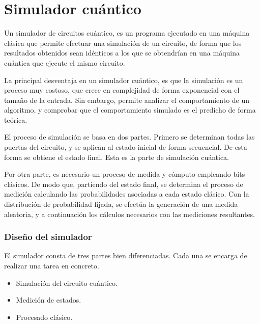 

\setcounter{part}{2}
\usetikzlibrary{shapes,arrows,chains}
\usetikzlibrary{decorations.markings}
\usepackage{booktabs}
\newcommand{\floor}[1]{\lfloor #1 \rfloor}




\part{Simulador cuántico}

Un simulador de circuitos cuántico, es un programa ejecutado en una máquina 
clásica que permite efectuar una simulación de un circuito, de forma que los 
resultados obtenidos sean idénticos a los que se obtendrían en una máquina 
cuántica que ejecute el mismo circuito.

La principal desventaja en un simulador cuántico, es que la simulación es un 
proceso muy costoso, que crece en complejidad de forma exponencial con el tamaño 
de la entrada. Sin embargo, permite analizar el comportamiento de un algoritmo, 
y comprobar que el comportamiento simulado es el predicho de forma teórica.

El proceso de simulación se basa en dos partes. Primero se determinan todas las 
puertas del circuito, y se aplican al estado inicial de forma secuencial. De 
esta forma se obtiene el estado final. Esta es la parte de simulación cuántica.

Por otra parte, es necesario un proceso de medida y cómputo empleando bits 
clásicos. De modo que, partiendo del estado final, se determina el proceso de 
medición calculando las probabilidades asociadas a cada estado clásico. Con la 
distribución de probabilidad fijada, se efectúa la generación de una medida 
aleatoria, y a continuación los cálculos necesarios con las mediciones 
resultantes.

\section{Diseño del simulador}
El simulador consta de tres partes bien diferenciadas. Cada una se encarga de 
realizar una tarea en concreto.
%
\begin{itemize}
\item Simulación del circuito cuántico.
\item Medición de estados.
\item Procesado clásico.
\end{itemize}

